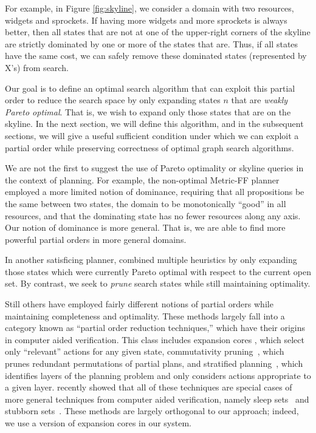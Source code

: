\documentclass[letterpaper]{article}
\theoremstyle{plain} \newtheorem{theorem}{Theorem} \newtheorem{proposition}{Proposition} \newtheorem{lemma}{Lemma}
\theoremstyle{definition} \newtheorem{definition}{Definition} \newtheorem{conjecture}{Conjecture} \newtheorem*{example}{Example}
\theoremstyle{remark} \newtheorem*{remark}{Remark} \newtheorem*{note}{Note} \newtheorem{case}{Case}
\begin{document}
For example, in Figure \ref{fig:skyline}, we consider a domain with
two resources, widgets and sprockets. If having more widgets and
more sprockets is always better, then all states that are not at one
of the upper-right corners of the skyline are strictly dominated by one or more
of the states that are.  Thus, if all states have the same cost,
we can safely remove these dominated states (represented by X's) from search.

Our goal is to define an optimal search algorithm that can exploit
this partial order to reduce the search space by only expanding
states $n$ that are \textit{weakly Pareto optimal}. That is, we
wish to expand only those states that are on the skyline. In the
next section, we will define this algorithm, and in the subsequent
sections, we will give a useful sufficient condition under which
we can exploit a partial order while preserving correctness of
optimal graph search algorithms.

We are not the first to suggest the use of Pareto optimality or
skyline queries in the context of planning. For example, the
non-optimal Metric-FF planner~\citep{hoffmann2003metric} employed
a more limited notion of dominance, requiring that all propositions
be the same between two states, the domain to be monotonically
``good'' in all resources, and that the dominating state has no
fewer resources along any axis. Our notion of dominance is more
general. That is, we are able to find more powerful partial
orders in more general domains.

In another satisficing planner, \citet{roger2010more} combined
multiple heuristics by only expanding those states which were
currently Pareto optimal with respect to the current open set.  By
contrast, we seek to \textit{prune} search states while still
maintaining optimality.

Still others have employed fairly different notions of partial
orders while maintaining completeness and optimality. These methods
largely fall into a category known as ``partial order reduction
techniques,'' which have their origins in computer aided verification.
This class includes expansion cores \citep{chen09completeness,
xu11theory}, which select only ``relevant'' actions for any given
state, commutativity pruning~\citep{geffner2000admissible}, which
prunes redundant permutations of partial plans, and stratified
planning~\citep{chen2009stratified}, which identifies layers of the
planning problem and only considers actions appropriate to a given
layer. \citet{wehrle2012partial} recently showed that all of these
techniques are special cases of more general techniques from computer
aided verification, namely sleep sets~\citep{godefroid96partial}
and stubborn sets~\citep{valmari92stubborn}. These methods are
largely orthogonal to our approach; indeed, we use a version of
expansion cores in our system.
\end{document}

